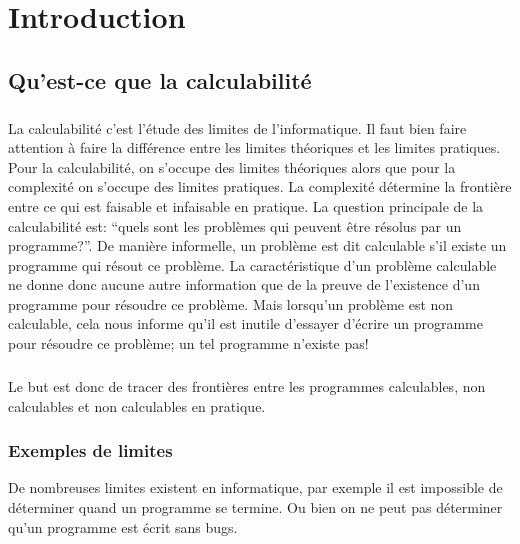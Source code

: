 
\chapter{Introduction}
\label{ch:introduction}

\section{Qu'est-ce que la calculabilité}
\label{sec:qu_est-ce_la_calculabilite}

\paragraph{}

La calculabilité c'est l'étude des limites de l'informatique. Il faut bien
faire attention à faire la différence entre les limites théoriques et les limites
pratiques. Pour la calculabilité, on s'occupe des limites théoriques alors que pour 
la complexité on s'occupe des limites pratiques. La complexité
détermine la frontière entre ce qui est faisable et infaisable en pratique.
La question principale de la calculabilité est: ``quels sont les problèmes qui peuvent
être résolus par un programme?''.  De manière informelle, un problème est dit calculable s'il existe un programme qui résout ce problème.  La caractéristique d'un problème calculable ne donne donc aucune 
autre information que de la preuve de l'existence d'un programme pour résoudre ce problème.  Mais lorsqu'un problème est non calculable, cela nous informe qu'il est inutile d'essayer d'écrire un programme pour résoudre ce problème; un tel programme n'existe pas!

\paragraph{} Le but est donc de tracer des frontières entre les programmes calculables,
non calculables et non calculables en pratique.


\subsection{Exemples de limites}
\label{subsec:exemples_limites}

De nombreuses limites existent en informatique, par exemple il est impossible de déterminer quand un programme se termine. Ou bien on ne peut pas déterminer qu'un programme est écrit sans bugs.

